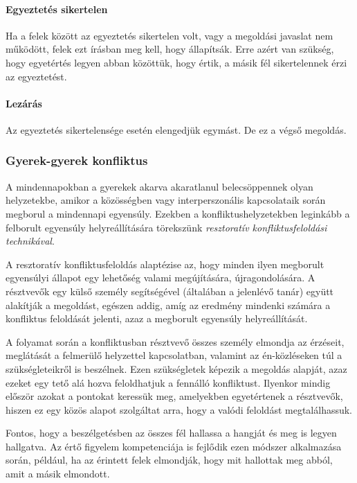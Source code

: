 \paragraph{Egyeztetés sikertelen}\label{egyeztetuxe9s-sikertelen}

Ha a felek között az egyeztetés sikertelen volt, vagy a megoldási
javaslat nem működött, felek ezt írásban meg kell, hogy állapítsák. Erre
azért van szükség, hogy egyetértés legyen abban közöttük, hogy értik, a
másik fél sikertelennek érzi az egyeztetést.

\paragraph{Lezárás}\label{lezuxe1ruxe1s}

Az egyeztetés sikertelensége esetén elengedjük egymást. De ez a végső
megoldás.

\subsubsection{Gyerek-gyerek
  konfliktus}\label{gyerek-gyerek-konfliktus}

A mindennapokban a gyerekek akarva akaratlanul belecsöppennek olyan
helyzetekbe, amikor a közösségben vagy interperszonális kapcsolataik során
megborul a mindennapi egyensúly. Ezekben a konfliktushelyzetekben leginkább a
felborult egyensúly helyreállítására törekszünk \emph{resztoratív konfliktusfeloldási
technikával}.

A resztoratív konfliktusfeloldás alaptézise az, hogy minden ilyen megborult
egyensúlyi állapot egy lehetőség valami megújítására, újragondolására. A
résztvevők egy külső személy segítségével (általában a jelenlévő tanár) együtt alakítják
a megoldást, egészen addig, amíg az eredmény mindenki számára a konfliktus
feloldását jelenti, azaz a megborult egyensúly helyreállítását.

A folyamat során a konfliktusban résztvevő összes személy elmondja az érzéseit,
meglátását a felmerülő helyzettel kapcsolatban, valamint az én-közléseken túl a
szükségleteikről is beszélnek. Ezen szükségletek képezik a megoldás alapját,
azaz ezeket egy tető alá hozva feloldhatjuk a fennálló konfliktust. Ilyenkor
mindig először azokat a pontokat keressük meg, amelyekben egyetértenek a
résztvevők, hiszen ez egy közös alapot szolgáltat arra, hogy a valódi feloldást
megtalálhassuk.

Fontos, hogy a beszélgetésben az összes fél hallassa a hangját és meg is legyen
hallgatva. Az értő figyelem kompetenciája is fejlődik ezen módszer alkalmazása
során, például, ha az érintett felek elmondják, hogy mit hallottak meg abból,
amit a másik elmondott.


